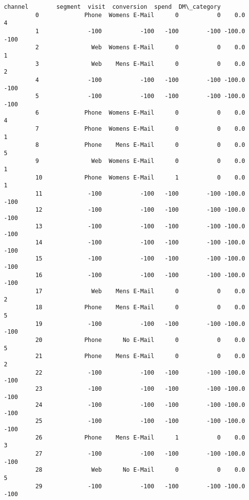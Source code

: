 \documentclass[11pt]{article}
\begin{document}
\begin{Verbatim}[commandchars=\\\{\}]
                     channel        segment  visit  conversion  spend  DM\_category  
         0             Phone  Womens E-Mail      0           0    0.0            4  
         1              -100           -100   -100        -100 -100.0         -100  
         2               Web  Womens E-Mail      0           0    0.0            1  
         3               Web    Mens E-Mail      0           0    0.0            2  
         4              -100           -100   -100        -100 -100.0         -100  
         5              -100           -100   -100        -100 -100.0         -100  
         6             Phone  Womens E-Mail      0           0    0.0            4  
         7             Phone  Womens E-Mail      0           0    0.0            1  
         8             Phone    Mens E-Mail      0           0    0.0            5  
         9               Web  Womens E-Mail      0           0    0.0            1  
         10            Phone  Womens E-Mail      1           0    0.0            1  
         11             -100           -100   -100        -100 -100.0         -100  
         12             -100           -100   -100        -100 -100.0         -100  
         13             -100           -100   -100        -100 -100.0         -100  
         14             -100           -100   -100        -100 -100.0         -100  
         15             -100           -100   -100        -100 -100.0         -100  
         16             -100           -100   -100        -100 -100.0         -100  
         17              Web    Mens E-Mail      0           0    0.0            2  
         18            Phone    Mens E-Mail      0           0    0.0            5  
         19             -100           -100   -100        -100 -100.0         -100  
         20            Phone      No E-Mail      0           0    0.0            5  
         21            Phone    Mens E-Mail      0           0    0.0            2  
         22             -100           -100   -100        -100 -100.0         -100  
         23             -100           -100   -100        -100 -100.0         -100  
         24             -100           -100   -100        -100 -100.0         -100  
         25             -100           -100   -100        -100 -100.0         -100  
         26            Phone    Mens E-Mail      1           0    0.0            3  
         27             -100           -100   -100        -100 -100.0         -100  
         28              Web      No E-Mail      0           0    0.0            5  
         29             -100           -100   -100        -100 -100.0         -100  

\end{Verbatim}
\end{document}

